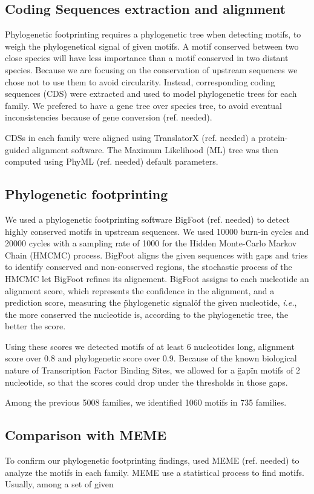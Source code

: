 \begin{materials}
\subsection{Coding Sequences extraction and alignment}

Phylogenetic footprinting requires a phylogenetic tree when detecting motifs, to weigh the phylogenetical signal of given motifs. A motif conserved between two close species will have less importance than a motif conserved in two distant species. Because we are focusing on the conservation of upstream sequences we chose not to use them to avoid circularity. Instead, corresponding coding sequences (CDS) were extracted and used to model phylogenetic trees for each family. We prefered to have a gene tree over species tree, to avoid eventual inconsistencies because of gene conversion (ref. needed).

CDSs in each family were aligned using TranslatorX (ref. needed) a protein-guided alignment software. The Maximum Likelihood (ML) tree was then computed using PhyML (ref. needed) default parameters.

\subsection{Phylogenetic footprinting}

We used a phylogenetic footprinting software BigFoot (ref. needed) to detect highly conserved motifs in upstream sequences. We used 10000 burn-in cycles and 20000 cycles with a sampling rate of 1000 for the Hidden Monte-Carlo Markov Chain (HMCMC) process. BigFoot aligns the given sequences with gaps and tries to identify conserved and non-conserved regions, the stochastic process of the HMCMC let BigFoot refines its alignement. BigFoot assigns to each nucleotide an alignment score, which represents the confidence in the alignment, and a prediction score, measuring the \"phylogenetic signal\" of the given nucleotide, \textit{i.e.}, the more conserved the nucleotide is, according to the phylogenetic tree, the better the score.

Using these scores we detected motifs of at least 6 nucleotides long, alignment score over 0.8 and phylogenetic score over 0.9. Because of the known biological nature of Transcription Factor Binding Sites, we allowed for a \"gap\" in motifs of 2 nucleotide, so that the scores could drop under the thresholds in those gaps.

Among the previous 5008 families, we identified 1060 motifs in 735 families.

\subsection{Comparison with MEME}

To confirm our phylogenetic footprinting findings, used MEME (ref. needed) to analyze the motifs in each family. MEME use a statistical process to find motifs. Usually, among a set of given

\end{materials}
